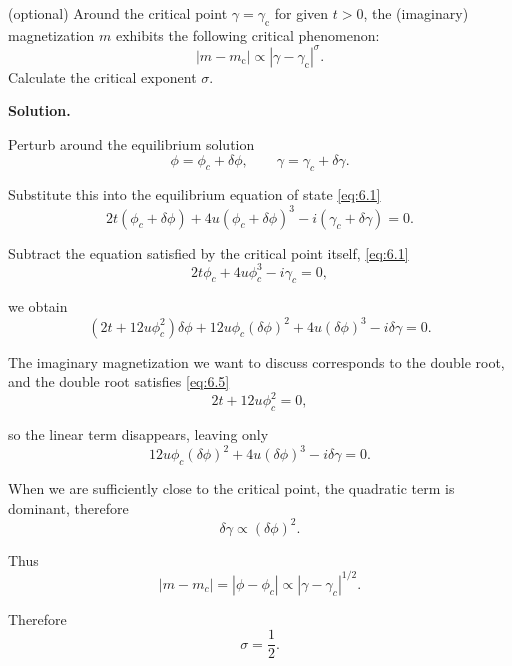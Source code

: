 \documentclass[11pt,a4paper]{article}
\newcounter{problem}
\newcounter{saveequation}
\newenvironment{solution}
{
	\par
	\setcounter{saveequation}{\value{equation}}
	\begingroup
	\setcounter{equation}{0}
	\renewcommand{\theequation}{\arabic{problem}.\arabic{equation}}
	\renewcommand{\theHequation}{sol.\arabic{problem}.\arabic{equation}}
	\noindent\textbf{Solution.}\quad
}
{
	\par
	\endgroup
	\setcounter{equation}{\value{saveequation}}
}
\begin{document}
	\begin{problembox}
		(optional) Around the critical point $\gamma = \gamma_{\mathrm c}$ for given $t > 0$, the (imaginary) magnetization $m$ exhibits the following critical phenomenon:
		\begin{equation}
			|m - m_{\mathrm c}| \propto |\gamma - \gamma_{\mathrm c}|^{\sigma}.
			\tag{7}
		\end{equation}
		Calculate the critical exponent $\sigma$.
	\end{problembox}
	\begin{solution}
		Perturb around the equilibrium solution
		\begin{equation}
			\phi=\phi_c+\delta\phi,\qquad \gamma=\gamma_c+\delta\gamma.
		\end{equation}
		
		Substitute this into the equilibrium equation of state \eqref{eq:6.1}
		\begin{equation}
			2t(\phi_c+\delta\phi)+4u(\phi_c+\delta\phi)^3-i(\gamma_c+\delta\gamma)=0.
		\end{equation}
		
		Subtract the equation satisfied by the critical point itself, \eqref{eq:6.1}
		\begin{equation}
			2t\phi_c+4u\phi_c^3-i\gamma_c=0,
		\end{equation}
		
		we obtain
		\begin{equation}
			(2t+12u\phi_c^2)\delta\phi+12u\phi_c(\delta\phi)^2+4u(\delta\phi)^3-i\delta\gamma=0.
		\end{equation}
		
		The imaginary magnetization we want to discuss corresponds to the double root, and the double root satisfies \eqref{eq:6.5}
		\begin{equation}
			2t+12u\phi_c^2=0,
		\end{equation}
		
		so the linear term disappears, leaving only
		\begin{equation}
			12u\phi_c(\delta\phi)^2+4u(\delta\phi)^3-i\delta\gamma=0.
		\end{equation}
		
		When we are sufficiently close to the critical point, the quadratic term is dominant, therefore
		\begin{equation}
			\delta\gamma\propto(\delta\phi)^2.
		\end{equation}
		
		Thus
		\begin{equation}
			|m-m_c|=|\phi-\phi_c|\propto|\gamma-\gamma_c|^{1/2}.
		\end{equation}
		
		\begin{finalanswer}
			Therefore
		\begin{equation}
			\label{fin:7}
			\sigma=\frac{1}{2}.
		\end{equation}
		\end{finalanswer}
	\end{solution}
\end{document}
